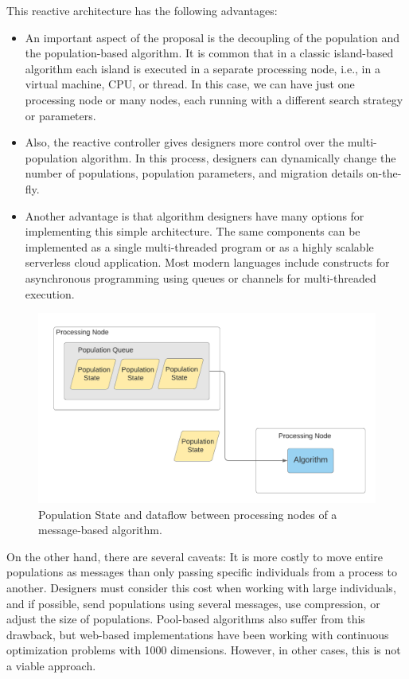 \documentclass[review]{elsarticle}
\begin{document}
This reactive architecture has the following advantages:\begin{itemize}
\item 
An important aspect of the proposal is the decoupling of the population and 
the population-based algorithm. It is common that in a classic island-based algorithm
each island is executed in a separate processing node, i.e., in a virtual machine, CPU,
or thread. In this case, we can have just one processing node or many nodes, each 
running with a different search strategy or parameters. 
\item 
Also, the reactive controller gives designers more control over the multi-population algorithm.
In this process, designers can dynamically change the number of populations, population parameters,
and migration details on-the-fly.
\item 
Another advantage is that algorithm designers have many options for implementing this simple architecture. 
The same components can be implemented as a single multi-threaded program or 
as a highly scalable serverless cloud application. Most modern languages include 
constructs for asynchronous programming using queues or channels for multi-threaded
execution.
\end{itemize}

\begin{figure}[ht]
    \centering
    \includegraphics[width=\textwidth]{population_message}
    \caption{Population State and dataflow between processing nodes of a message-based algorithm.}
    \label{fig:population_message}
\end{figure}

On the other hand, there are several caveats: It is more
costly to move entire populations as messages than only passing
specific individuals from a process to another. Designers must consider
this cost when working with large individuals, and if possible, send
populations using several messages, use compression, or adjust the size
of populations. Pool-based algorithms also suffer from this drawback,
but web-based implementations have been working with continuous
optimization problems with 1000 dimensions.  However, in other cases, %
this is not a viable approach.
\end{document}
